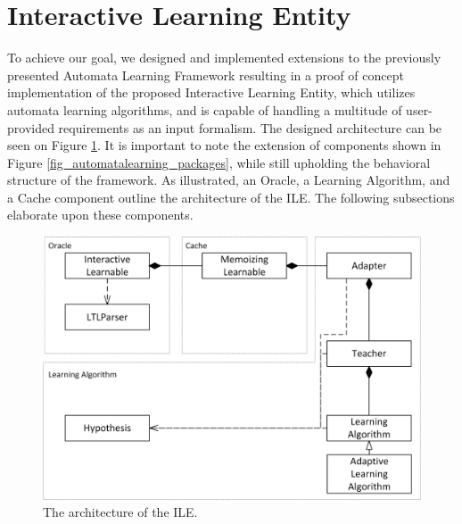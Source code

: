 \smallskip

\section{Interactive Learning Entity} \label{sec_interactivelearningframework}

To achieve our goal, we designed and implemented extensions to the previously presented Automata Learning Framework resulting in a proof of concept implementation of the proposed Interactive Learning Entity, which utilizes automata learning algorithms, and is capable of handling a multitude of user-provided requirements as an input formalism. The designed architecture can be seen on Figure \ref{fig_automatonlearning_overview}. It is important to note the extension of components shown in Figure \ref{fig_automatalearning_packages}, while still upholding the behavioral structure of the framework. As illustrated, an Oracle, a Learning Algorithm, and a Cache component outline the architecture of the ILE. The following subsections elaborate upon these components.

\begin{figure}[H] 
	\centering
	\includegraphics[width=120mm, keepaspectratio]{figures/automatalearning_overview.png}
	\caption{The architecture of the ILE.} 
	\label{fig_automatonlearning_overview}
\end{figure}

